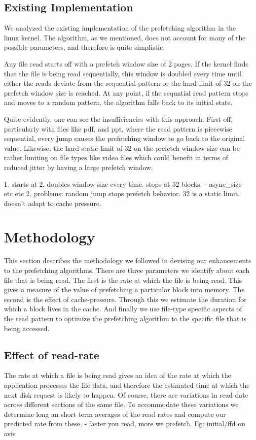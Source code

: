 \documentclass[twocolumn,10pt]{article}
\begin{document}
\subsection{Existing Implementation}

We analyzed the existing implementation of the prefetching algorithm in
the linux kernel. The algorithm, as we mentioned, does not account for
many of the possible parameters, and therefore is quite simplistic.

Any file read starts off with a prefetch window size of 2 pages. If the kernel finds that
the file is being read sequentially, this window is doubled every time until either
the reads deviate from the sequential pattern or the hard limit of 32 on the prefetch
window size is reached. At any point, if the sequntial read pattern stops and moves to a 
random pattern, the algorithm falls back to its initial state.

Quite evidently, one can see the insufficiencies with this approach. First off, particularly
with files like pdf, and ppt, where the read pattern is piecewise sequential, every jump causes the prefetching window to go back to the original value. Likewise, the hard static limit of 32 on the prefetch window size can be rather limiting on file types like video files which could benefit in terms of reduced jitter by having a large prefetch window.

1. starts at 2, doubles window size every time. stops at 32 blocks.
	- async\_size etc etc
2. problems: random jump stops prefetch behavior. 32 is a static limit. doesn't
adapt to cache pressure.

\section{Methodology}

This section describes the methodology we followed in devising our enhancements to
the prefetching algorithms. There are three parameters we identify about each
file that is being read. The first is the rate at which the file is being read.
This gives a measure of the value of prefetching a particular block into memory.
The second is the effect of cache-pressure. Through this we estimate the duration
for which a block lives in the cache. And finally we use file-type specific aspects
of the read pattern to optimize the prefetching algorithm to the specific file
that is being accessed.

\subsection{Effect of read-rate}
The rate at which a file is being read gives an idea of the rate at which the 
application processes the file data, and therefore the estimated time at which
the next disk request is likely to happen. Of course, there are variations in 
read date across different sections of the same file. To accommodate these variations
we determine long an short term averages of the read rates and compute our predicted
rate from these.
	- faster you read, more we prefetch. Eg: initial/ffd on avis 
\end{document}
